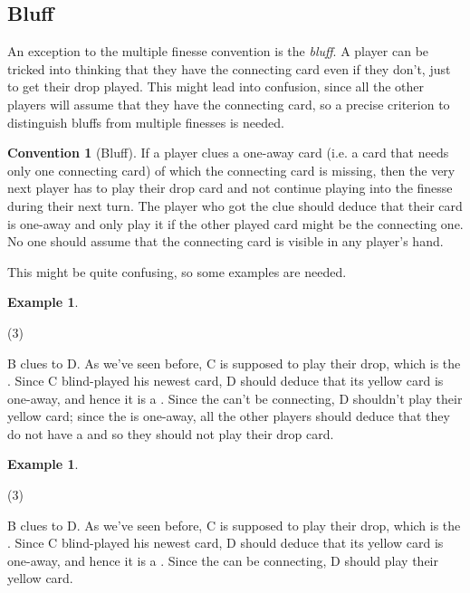 \documentclass[a4paper]{article}
\theoremstyle{plain}
\theoremstyle{definition}
\newtheorem{example}[theorem]{Example}
\newtheorem{convention}[theorem]{Convention}
\begin{document}
\subsection{Bluff}

An exception to the multiple finesse convention is the \textit{bluff}. A player can be tricked into thinking that they have the connecting card even if they don't, just to get their drop played. This might lead into confusion, since all the other players will assume that they have the connecting card, so a precise criterion to distinguish bluffs from multiple finesses is needed.

\begin{convention}[Bluff]
	If a player clues a one-away card (i.e. a card that needs only one connecting card) of which the connecting card is missing, then the very next player has to play their drop card and not continue playing into the finesse during their next turn. The player who got the clue should deduce that their card is one-away and only play it if the other played card might be the connecting one. No one should assume that the connecting card is visible in any player's hand.
\end{convention}

This might be quite confusing, so some examples are needed.

\begin{example}
	\hfill
	\begin{tasks}(3)
		\task[+]      
		\task[A]    
		\task[B]    
		\task[C]    
		\task[D]    
		\task[E]    
	\end{tasks}
	
	B clues  to D. As we've seen before, C is supposed to play their drop, which is the . Since C blind-played his newest card, D should deduce that its yellow card is one-away, and hence it is a . Since the  can't be connecting, D shouldn't play their yellow card; since the  is one-away, all the other players should deduce that they do not have a  and so they should not play their drop card.
\end{example}

\begin{example}
	\hfill
	\begin{tasks}(3)
		\task[+]      
		\task[A]    
		\task[B]    
		\task[C]    
		\task[D]    
		\task[E]    
	\end{tasks}
	
	B clues  to D. As we've seen before, C is supposed to play their drop, which is the . Since C blind-played his newest card, D should deduce that its yellow card is one-away, and hence it is a . Since the  can be connecting, D should play their yellow card.
\end{example}
\end{document}
